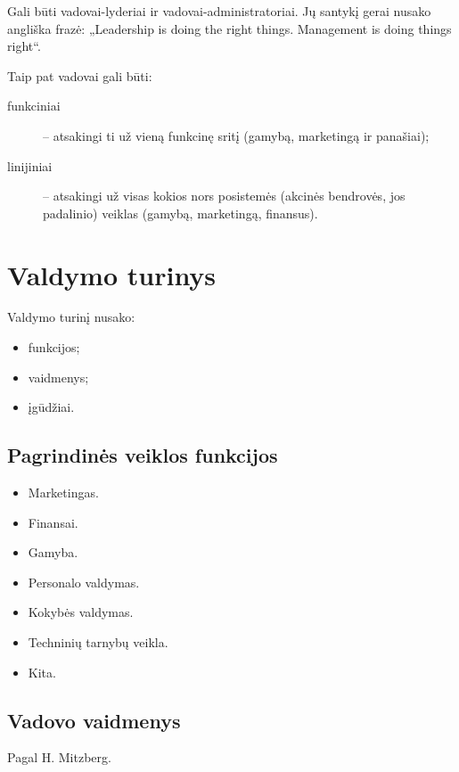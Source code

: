 Gali būti vadovai-lyderiai ir vadovai-administratoriai. Jų santykį
gerai nusako angliška frazė: „Leadership is doing the right things.
Management is doing things right“.

Taip pat vadovai gali būti:
\begin{description}
  \item[funkciniai] – atsakingi ti už vieną funkcinę sritį
    (gamybą, marketingą ir panašiai);
  \item[linijiniai] – atsakingi už visas kokios nors posistemės
    (akcinės bendrovės, jos padalinio) veiklas (gamybą, marketingą,
    finansus).
\end{description}

\section{Valdymo turinys}

Valdymo turinį nusako:
\begin{itemize}
  \item funkcijos;
  \item vaidmenys;
  \item įgūdžiai.
\end{itemize}

\subsection{Pagrindinės veiklos funkcijos}

\begin{itemize}
  \item Marketingas.
  \item Finansai.
  \item Gamyba.
  \item Personalo valdymas.
  \item Kokybės valdymas.
  \item Techninių tarnybų veikla.
  \item Kita.
\end{itemize}

\subsection{Vadovo vaidmenys}

Pagal H. Mitzberg.


